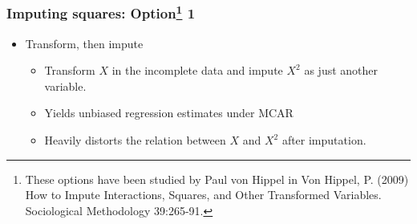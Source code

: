 \documentclass{beamer}
\begin{document}
\begin{frame}
  \frametitle{Imputing squares: Option\footnote{\tiny{These options have been studied by Paul von Hippel in Von Hippel, P. (2009) How to Impute Interactions, Squares, and Other Transformed
Variables. Sociological Methodology 39:265-91.}} 1}
  \begin{itemize}
  \item Transform, then impute
  \begin{itemize}
  \item Transform $X$ in the incomplete data and impute $X^2$ as just another variable.
  \item Yields unbiased regression estimates under MCAR
  \item Heavily distorts the relation between $X$ and $X^2$ after imputation. 
  \end{itemize}
  \end{itemize}
  \vspace{0.2 in}
\end{frame}
\end{document}
